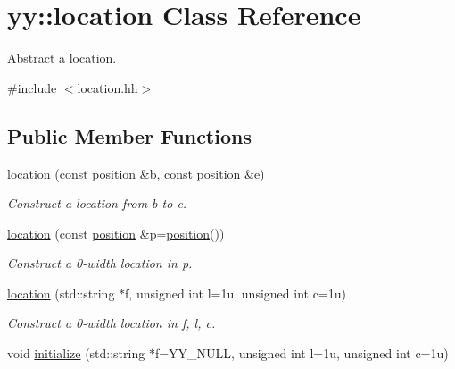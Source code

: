 \hypertarget{classyy_1_1location}{\section{yy\-:\-:location Class Reference}
\label{classyy_1_1location}
}


Abstract a location.  




{\ttfamily \#include $<$location.\-hh$>$}

\subsection*{Public Member Functions}
\begin{DoxyCompactItemize}
\item 
\hypertarget{classyy_1_1location_a0d659c37bcd57075c7bb25e600d3f526}{\hyperlink{classyy_1_1location_a0d659c37bcd57075c7bb25e600d3f526}{location} (const \hyperlink{classyy_1_1position}{position} \&b, const \hyperlink{classyy_1_1position}{position} \&e)}\label{classyy_1_1location_a0d659c37bcd57075c7bb25e600d3f526}

\begin{DoxyCompactList}\small\item\em Construct a location from {\itshape b} to {\itshape e}. \end{DoxyCompactList}\item 
\hypertarget{classyy_1_1location_a378c53e8dc67416748f0b12844919e51}{\hyperlink{classyy_1_1location_a378c53e8dc67416748f0b12844919e51}{location} (const \hyperlink{classyy_1_1position}{position} \&p=\hyperlink{classyy_1_1position}{position}())}\label{classyy_1_1location_a378c53e8dc67416748f0b12844919e51}

\begin{DoxyCompactList}\small\item\em Construct a 0-\/width location in {\itshape p}. \end{DoxyCompactList}\item 
\hypertarget{classyy_1_1location_a75594362f84338b764164cd632ee7d9e}{\hyperlink{classyy_1_1location_a75594362f84338b764164cd632ee7d9e}{location} (std\-::string $\ast$f, unsigned int l=1u, unsigned int c=1u)}\label{classyy_1_1location_a75594362f84338b764164cd632ee7d9e}

\begin{DoxyCompactList}\small\item\em Construct a 0-\/width location in {\itshape f}, {\itshape l}, {\itshape c}. \end{DoxyCompactList}\item 
\hypertarget{classyy_1_1location_a0f7f01fcb693c6ea82f4b087d77fdb38}{void \hyperlink{classyy_1_1location_a0f7f01fcb693c6ea82f4b087d77fdb38}{initialize} (std\-::string $\ast$f=Y\-Y\-\_\-\-N\-U\-L\-L, unsigned int l=1u, unsigned int c=1u)}\label{classyy_1_1location_a0f7f01fcb693c6ea82f4b087d77fdb38}


\end{DoxyCompactItemize}
